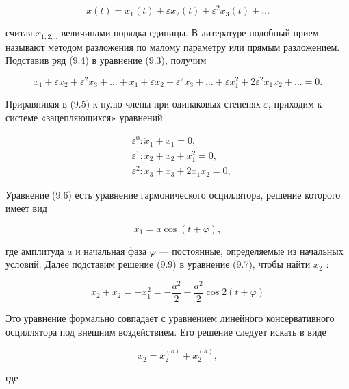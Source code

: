 \documentclass[10pt]{article}
\begin{document}
\begin{equation*}
x(t)=x_{1}(t)+\varepsilon x_{2}(t)+\varepsilon^{2} x_{3}(t)+\ldots \tag{9.4}
\end{equation*}


считая $x_{1,2, . .}$ величинами порядка единицы. В литературе подобный прием называют методом разложения по малому параметру или прямым разложением. Подставив ряд (9.4) в уравнение (9.3), получим


\begin{equation*}
\ddot{x}_{1}+\varepsilon \ddot{x}_{2}+\varepsilon^{2} \ddot{x}_{3}+\ldots+x_{1}+\varepsilon x_{2}+\varepsilon^{2} x_{3}+\ldots+\varepsilon x_{1}^{2}+2 \varepsilon^{2} x_{1} x_{2}+\ldots=0 . \tag{9.5}
\end{equation*}


Приравнивая в (9.5) к нулю члены при одинаковых степенях $\varepsilon$, приходим к системе «зацепляющихся» уравнений


\begin{align*}
& \varepsilon^{0}: \ddot{x}_{1}+x_{1}=0,  \tag{9.6}\\
& \varepsilon^{1}: \ddot{x}_{2}+x_{2}+x_{1}^{2}=0,  \tag{9.7}\\
& \varepsilon^{2}: \ddot{x}_{3}+x_{3}+2 x_{1} x_{2}=0, \tag{9.8}
\end{align*}


Уравнение (9.6) есть уравнение гармонического осциллятора, решение которого имеет вид


\begin{equation*}
x_{1}=a \cos (t+\varphi), \tag{9.9}
\end{equation*}


где амплитуда $a$ и начальная фаза $\varphi$ — постоянные, определяемые из начальных условий. Далее подставим решение (9.9) в уравнение (9.7), чтобы найти $x_{2}$ :


\begin{equation*}
\ddot{x}_{2}+x_{2}=-x_{1}^{2}=-\frac{a^{2}}{2}-\frac{a^{2}}{2} \cos 2(t+\varphi) \tag{9.10}
\end{equation*}


Это уравнение формально совпадает с уравнением линейного консервативного осциллятора под внешним воздействием. Его решение следует искать в виде


\begin{equation*}
x_{2}=x_{2}^{(o)}+x_{2}^{(h)}, \tag{9.11}
\end{equation*}


где
\end{document}
